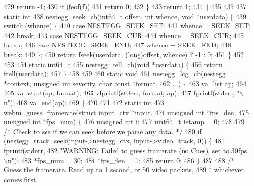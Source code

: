 \begin{DoxyCodeInclude}
{{{{{{{{{429       \textcolor{keywordflow}{return} -1;
430     \textcolor{keywordflow}{if} (feof(f))
431       \textcolor{keywordflow}{return} 0;
432   \}
433   \textcolor{keywordflow}{return} 1;
434 \}
435 
436 
437 \textcolor{keyword}{static} \textcolor{keywordtype}{int}
438 nestegg\_seek\_cb(int64\_t offset, \textcolor{keywordtype}{int} whence, \textcolor{keywordtype}{void} *userdata) \{
439   \textcolor{keywordflow}{switch} (whence) \{
440     \textcolor{keywordflow}{case} NESTEGG\_SEEK\_SET:
441       whence = SEEK\_SET;
442       \textcolor{keywordflow}{break};
443     \textcolor{keywordflow}{case} NESTEGG\_SEEK\_CUR:
444       whence = SEEK\_CUR;
445       \textcolor{keywordflow}{break};
446     \textcolor{keywordflow}{case} NESTEGG\_SEEK\_END:
447       whence = SEEK\_END;
448       \textcolor{keywordflow}{break};
449   \};
450   \textcolor{keywordflow}{return} fseek(userdata, (\textcolor{keywordtype}{long})offset, whence) ? -1 : 0;
451 \}
452 
453 
454 \textcolor{keyword}{static} int64\_t
455 nestegg\_tell\_cb(\textcolor{keywordtype}{void} *userdata) \{
456   \textcolor{keywordflow}{return} ftell(userdata);
457 \}
458 
459 
460 \textcolor{keyword}{static} \textcolor{keywordtype}{void}
461 nestegg\_log\_cb(nestegg *context, \textcolor{keywordtype}{unsigned} \textcolor{keywordtype}{int} severity, \textcolor{keywordtype}{char} \textcolor{keyword}{const} *format,
462                ...) \{
463   va\_list ap;
464 
465   va\_start(ap, format);
466   vfprintf(stderr, format, ap);
467   fprintf(stderr, \textcolor{stringliteral}{"\(\backslash\)n"});
468   va\_end(ap);
469 \}
470 
471 
472 \textcolor{keyword}{static} \textcolor{keywordtype}{int}
473 webm\_guess\_framerate(\textcolor{keyword}{struct} input\_ctx *input,
474                      \textcolor{keywordtype}{unsigned} \textcolor{keywordtype}{int}     *fps\_den,
475                      \textcolor{keywordtype}{unsigned} \textcolor{keywordtype}{int}     *fps\_num) \{
476   \textcolor{keywordtype}{unsigned} \textcolor{keywordtype}{int} i;
477   uint64\_t     tstamp = 0;
478 
479   \textcolor{comment}{/* Check to see if we can seek before we parse any data. */}
480   \textcolor{keywordflow}{if} (nestegg\_track\_seek(input->nestegg\_ctx, input->video\_track, 0)) \{
481     fprintf(stderr,
482             \textcolor{stringliteral}{"WARNING: Failed to guess framerate (no Cues), set to 30fps.\(\backslash\)n"});
483     *fps\_num = 30;
484     *fps\_den = 1;
485     \textcolor{keywordflow}{return} 0;
486   \}
487 
488   \textcolor{comment}{/* Guess the framerate. Read up to 1 second, or 50 video packets,}
489 \textcolor{comment}{   * whichever comes first.}
}}}}}}}}}
\end{DoxyCodeInclude}
